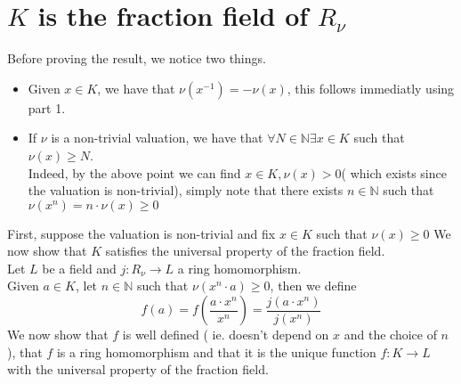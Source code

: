 \documentclass[11pt, a4paper]{article}
\begin{document}
\section*{$K$ is the fraction field of $R_\nu$ }
Before proving the result, we notice two things.
\begin{itemize}
\item Given $x\in K$, we have that $\nu( x^{-1}) = - \nu( x) $, this follows immediatly using part 1.
\item If $\nu$ is a non-trivial valuation, we have that $\forall N \in \mathbb{N} \exists x\in K$ such that $\nu( x) \geq N$.\\
	Indeed, by the above point we can find $x\in K, \nu( x) > 0$( which exists since the valuation is non-trivial), simply note that there exists $n\in \mathbb{N}$ such that $\nu( x^{n}) =n\cdot \nu( x) \geq 0$ 
\end{itemize}
First, suppose the valuation is non-trivial and fix $x\in K$ such that $\nu( x) \geq 0$ 
We now show that $K$ satisfies the universal property of the fraction field.\\
Let $L$ be a field and $j: R_\nu\to L$ a ring homomorphism.\\
Given $a\in K$, let $n \in \mathbb{N}$ such that $\nu( x^{n}\cdot a) \geq 0$, then we define
\[ 
	f( a) = f( \frac{a\cdot x^{n}}{x^{n}}) = \frac{j( a\cdot x^{n}) }{ j( x^{n}) }
\]
We now show that $f$ is well defined ( ie. doesn't depend on $x$ and the choice of $n$ ), that $f$ is a ring homomorphism and that it is the unique function $f: K \to L $ with the universal property of the fraction field.
\end{document}
